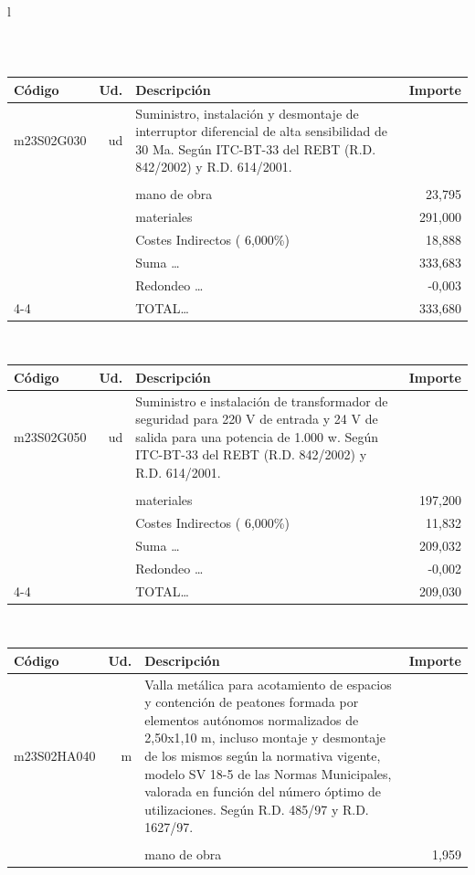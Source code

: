 \documentclass{book}%
\begin{document}
\begin{longtable}{l}
\begin{tabular}{l r p{60mm} r}
\end{tabular}\\%
\begin{tabular}{l r p{60mm} r}%
Código&Ud.&Descripción&Importe\\%
\hline%
m23S02G030&ud&Suministro, instalación y desmontaje de interruptor diferencial de alta sensibilidad de 30 Ma. Según ITC{-}BT{-}33 del REBT (R.D. 842/2002) y R.D. 614/2001.&\\%
&&&\\%
&&mano de obra&    23,795\\%
&&materiales&   291,000\\%
&&Costes Indirectos (     6,000\%)&    18,888\\%
&&Suma \ldots&   333,683\\%
&&Redondeo \ldots&    {-}0,003\\%
\cline{4-4}%
&&TOTAL\ldots&   333,680\\%
\end{tabular}\\%
\begin{tabular}{l r p{60mm} r}%
Código&Ud.&Descripción&Importe\\%
\hline%
m23S02G050&ud&Suministro e instalación de transformador de seguridad para 220 V de entrada y 24 V de salida para una potencia de 1.000 w. Según ITC{-}BT{-}33 del REBT (R.D. 842/2002) y R.D. 614/2001.&\\%
&&&\\%
&&materiales&   197,200\\%
&&Costes Indirectos (     6,000\%)&    11,832\\%
&&Suma \ldots&   209,032\\%
&&Redondeo \ldots&    {-}0,002\\%
\cline{4-4}%
&&TOTAL\ldots&   209,030\\%
\end{tabular}\\%
\begin{tabular}{l r p{60mm} r}%
Código&Ud.&Descripción&Importe\\%
\hline%
m23S02HA040&m&Valla metálica para acotamiento de espacios y contención de peatones formada por elementos autónomos normalizados de 2,50x1,10 m, incluso montaje y desmontaje de los mismos según la normativa vigente, modelo SV 18{-}5 de las Normas Municipales, valorada en función del número óptimo de utilizaciones. Según R.D. 485/97 y R.D. 1627/97.&\\%
&&&\\%
&&mano de obra&     1,959\\%

\end{tabular}
\end{longtable}
\end{document}
